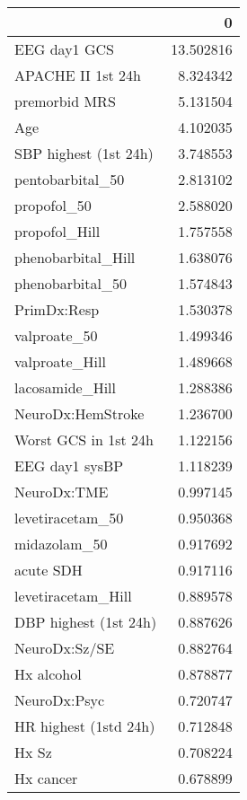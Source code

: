 \begin{tabular}{lr}
\toprule
{} &          0 \\
\midrule
EEG day1 GCS                   &  13.502816 \\
APACHE II 1st 24h              &   8.324342 \\
premorbid MRS                  &   5.131504 \\
Age                            &   4.102035 \\
SBP highest (1st 24h)          &   3.748553 \\
pentobarbital\_50               &   2.813102 \\
propofol\_50                    &   2.588020 \\
propofol\_Hill                  &   1.757558 \\
phenobarbital\_Hill             &   1.638076 \\
phenobarbital\_50               &   1.574843 \\
PrimDx:Resp                    &   1.530378 \\
valproate\_50                   &   1.499346 \\
valproate\_Hill                 &   1.489668 \\
lacosamide\_Hill                &   1.288386 \\
NeuroDx:HemStroke              &   1.236700 \\
Worst GCS in 1st 24h           &   1.122156 \\
EEG day1 sysBP                 &   1.118239 \\
NeuroDx:TME                    &   0.997145 \\
levetiracetam\_50               &   0.950368 \\
midazolam\_50                   &   0.917692 \\
acute SDH                      &   0.917116 \\
levetiracetam\_Hill             &   0.889578 \\
DBP highest (1st 24h)          &   0.887626 \\
NeuroDx:Sz/SE                  &   0.882764 \\
Hx alcohol                     &   0.878877 \\
NeuroDx:Psyc                   &   0.720747 \\
HR highest (1std 24h)          &   0.712848 \\
Hx Sz                          &   0.708224 \\
Hx cancer                      &   0.678899 \\

\end{tabular}
